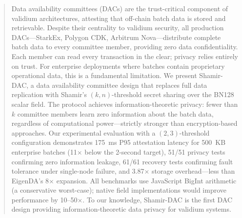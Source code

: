 
\begin{abstract}
Data availability committees (DACs) are the trust-critical component of
validium architectures, attesting that off-chain batch data is stored and
retrievable. Despite their centrality to validium security, all production
DACs---StarkEx, Polygon CDK, Arbitrum Nova---distribute complete batch data
to every committee member, providing zero data confidentiality. Each member
can read every transaction in the clear; privacy relies entirely on trust.
For enterprise deployments where batches contain proprietary operational
data, this is a fundamental limitation. We present Shamir-DAC, a data
availability committee design that replaces full data replication with
Shamir's $(k,n)$-threshold secret sharing over the BN128 scalar field.
The protocol achieves information-theoretic privacy: fewer than $k$
committee members learn zero information about the batch data, regardless
of computational power---strictly stronger than encryption-based
approaches. Our experimental evaluation with a $(2,3)$-threshold
configuration demonstrates 175~ms P95 attestation latency for 500~KB
enterprise batches (11$\times$ below the 2-second target), 51/51 privacy
tests confirming zero information leakage, 61/61 recovery tests confirming
fault tolerance under single-node failure, and 3.87$\times$ storage
overhead---less than EigenDA's 8$\times$ expansion. All benchmarks use
JavaScript BigInt arithmetic (a conservative worst-case); native field
implementations would improve performance by 10--50$\times$. To our
knowledge, Shamir-DAC is the first DAC design providing
information-theoretic data privacy for validium systems.
\end{abstract}
